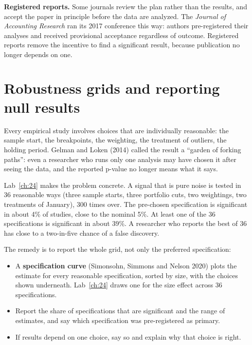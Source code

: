 \textbf{Registered reports.} Some journals review the plan rather than the results, and accept the paper in principle before the data are analyzed. The \emph{Journal of Accounting Research} ran its 2017 conference this way: authors pre-registered their analyses and received provisional acceptance regardless of outcome. Registered reports remove the incentive to find a significant result, because publication no longer depends on one.

\section{Robustness grids and reporting null results}
\label{sec:24-robust}

Every empirical study involves choices that are individually reasonable: the sample start, the breakpoints, the weighting, the treatment of outliers, the holding period. Gelman and Loken (2014) called the result a ``garden of forking paths'': even a researcher who runs only one analysis may have chosen it after seeing the data, and the reported p-value no longer means what it says.

Lab~\ref{ch:24} makes the problem concrete. A signal that is pure noise is tested in 36 reasonable ways (three sample starts, three portfolio cuts, two weightings, two treatments of January), 300 times over. The pre-chosen specification is significant in about 4\% of studies, close to the nominal 5\%. At least one of the 36 specifications is significant in about 39\%. A researcher who reports the best of 36 has close to a two-in-five chance of a false discovery.

The remedy is to report the whole grid, not only the preferred specification:

\begin{itemize}
  \item A \textbf{specification curve} (Simonsohn, Simmons and Nelson 2020) plots the estimate for every reasonable specification, sorted by size, with the choices shown underneath. Lab~\ref{ch:24} draws one for the size effect across 36 specifications.
  \item Report the share of specifications that are significant and the range of estimates, and say which specification was pre-registered as primary.
  \item If results depend on one choice, say so and explain why that choice is right.
\end{itemize}

